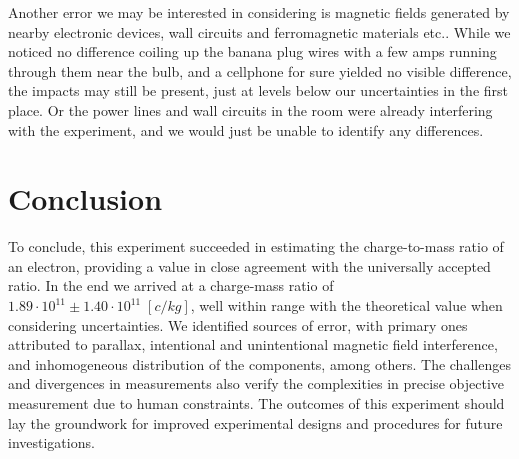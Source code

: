 \documentclass[12pt]{article}
\begin{document}
Another error we may be interested in considering is magnetic fields generated by nearby electronic devices, wall circuits and ferromagnetic materials etc.. While we noticed no difference coiling up the banana plug wires with a few amps running through them near the bulb, and a cellphone for sure yielded no visible difference, the impacts may still be present, just at levels below our uncertainties in the first place. Or the power lines and wall circuits in the room were already interfering with the experiment, and we would just be unable to identify any differences.

\section*{Conclusion}
To conclude, this experiment succeeded in estimating the charge-to-mass ratio of an electron, providing a value in close agreement with the universally accepted ratio.  In the end we arrived at a charge-mass ratio of $1.89\cdot10^{11}\pm1.40\cdot10^{11}\;\left[c/kg\right]$, well within range with the theoretical value when considering uncertainties. We identified sources of error, with primary ones attributed to parallax, intentional and unintentional magnetic field interference, and inhomogeneous distribution of the components, among others. The challenges and divergences in measurements also verify the complexities in precise objective measurement due to human constraints. The outcomes of this experiment should lay the groundwork for improved experimental designs and procedures for future investigations.
\newpage
\printbibliography
\end{document}

